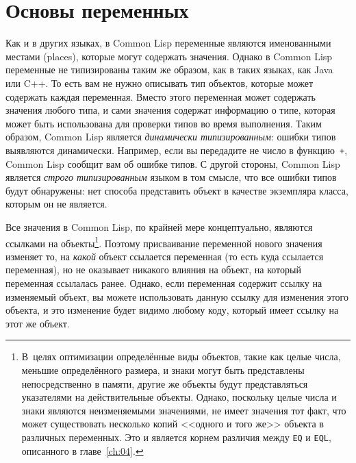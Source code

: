 \section{Основы переменных}

Как и в других языках, в Common Lisp переменные являются именованными мес\-тами (places),
которые могут содержать значения. Однако в Common Lisp переменные не типизированы таким же
образом, как в таких языках, как Java или C++. То есть вам не нужно описывать тип
объектов, которые может содержать каждая переменная. Вместо этого переменная может
содержать значения любого типа, и сами значения содержат информацию о типе, которая может
быть использована для проверки типов во время выполнения. Таким образом, Common Lisp
является \textit{динамически типизированным}: ошибки типов выявляются
динамически. Например, если вы передадите не число в функцию~\lstinline{+}, Common Lisp
сообщит вам об ошибке типов. С другой стороны, Common Lisp является \textit{строго
  типизированным} языком в том смысле, что все ошибки типов будут обнаружены: нет способа
представить объект в качестве экземпляра класса, которым он не является.

Все значения в Common Lisp, по крайней мере концептуально, являются ссылками на
объекты\footnote{В~целях оптимизации определённые виды объектов, такие как целые числа,
  меньшие определённого размера, и знаки могут быть представлены непосредственно в памяти,
  другие же объекты будут представляться указателями на действительные объекты. Однако,
  поскольку целые числа и знаки являются неизменяемыми значениями, не имеет значения тот
  факт, что может существовать несколько копий <<одного и того же>> объекта в различных
  переменных. Это и является корнем различия между \lstinline{EQ} и \lstinline{EQL}, описанного
  в главе~\ref{ch:04}.}\hspace{\footnotenegspace}. Поэтому присваивание переменной нового значения изменяет то, на
  \textit{какой} объект ссылается переменная (то есть куда ссылается переменная), но не
  оказывает никакого влияния на объект, на который переменная ссылалась ранее. Однако,
  если переменная содержит ссылку на изменяемый объект, вы можете использовать данную
  ссылку для изменения этого объекта, и это изменение будет видимо любому коду, который
  имеет ссылку на этот же объект.

